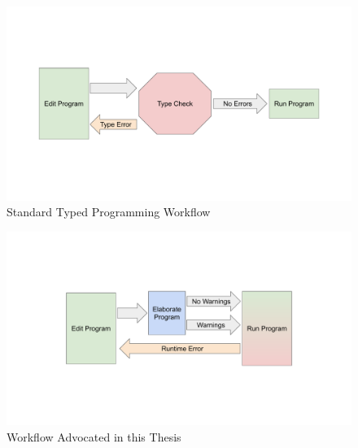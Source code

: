 \begin{figure}

\centerline{\includegraphics[width=5in]{fig/standardWorkflow.pdf}}

\caption{Standard Typed Programming Workflow}
\label{fig:intro-standard-workflow}
\end{figure}

\begin{figure}
\centerline{\includegraphics[width=5in]{fig/new-workflow.pdf}}

\caption{Workflow Advocated in this Thesis}
\label{fig:intro-thesis-workflow}
\end{figure}

